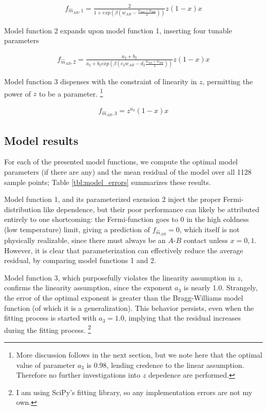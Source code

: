 \documentclass[10pt]{article}
\begin{document}
\begin{align}
    f_{\hat{m}_{AB},1} = 
    \frac{2}{1 + exp\left(\beta \left(w_{AB} - \frac{w_{AA} + w_{BB}}{2}\right) \right)}
    z (1-x) x
\end{align}

Model function 2 expands upon model function 1, inserting four tunable parameters

\begin{align}
    f_{\hat{m}_{AB},2} = 
    \frac{a_2+b_2}{a_2 + b_2 exp\left(\beta \left(c_2 w_{AB} - d_2 \frac{w_{AA} + w_{BB}}{2}\right) \right)}
    z (1-x) x
\end{align}

Model function 3 dispenses with the constraint of linearity in $z$, permitting the power of $z$ to be a parameter. \footnote{More discussion follows in the next section, but we note here that the optimal value of parameter $a_3$ is $0.98$, lending credence to the linear assumption.
Therefore no further investigations into $z$ depedence are performed.}

\begin{align}
    f_{\hat{m}_{AB},3} = z^{a_3} (1-x) x
\end{align}

\subsection{Model results}
For each of the presented model functions, we compute the optimal model parameters (if there are any) and the mean residual of the model over all 1128 sample points; Table \ref{tbl:model_errors} summarizes these results.

Model function 1, and its parameterized exension 2 inject the proper Fermi-distribution like dependence, but their poor performance can likely be attributed entirely to one shortcoming: the Fermi-function goes to $0$ in the high coldness (low temperature) limit, giving a prediction of $f_{\hat{m}_{AB}} = 0$, which itself is not physically realizable, since there must always be an $A$-$B$ contact unless $x=0,1$.
However, it is clear that parameterization can effectively reduce the average residual, by comparing model functions 1 and 2.

Model function 3, which purposefully violates the linearity assumption in $z$, confirms the linearity assumption, since the exponent $a_3$ is nearly 1.0. Strangely, the error of the optimal exponent is greater than the Bragg-Williams model function (of which it is a generalization). This behavior persists, even when the fitting process is started with $a_3 = 1.0$, implying that the residual increases during the fitting process. \footnote{I am using SciPy's fitting library, so any implementation errors are not my own.}
\end{document}
